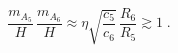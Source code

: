 \begin{equation}
\frac{m_{A_5}}{H}\, \frac{m_{A_6}}{H} \approx \eta
\sqrt{\frac{c_5}{c_6}} \,\frac{R_6}{R_5} \gtrsim 1 \;.
\end{equation}

